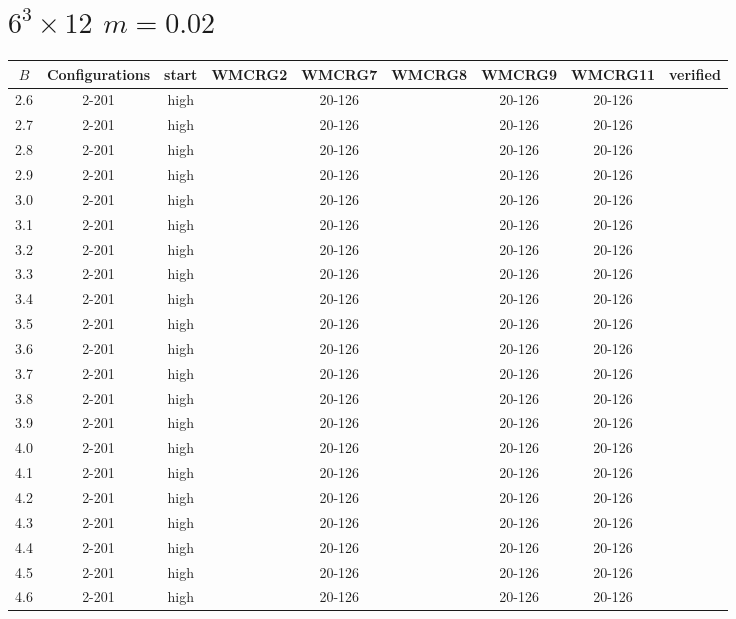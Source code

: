 \documentclass{article}
\begin{document}
  \section*{$6^3\times12$  $m=0.02$}
    \begin{center}
    \begin{tabular}{| c | c | c | c | c | c | c | c | c |}
      \hline
      $B$ & Configurations & start & WMCRG2 & WMCRG7 & WMCRG8 & WMCRG9 & WMCRG11 & verified\\
      \hline
      2.6 & 2-201 & high &  & 20-126 &  & 20-126 & 20-126 &\\
      2.7 & 2-201 & high &  & 20-126 &  & 20-126 & 20-126 &\\
      2.8 & 2-201 & high &  & 20-126 &  & 20-126 & 20-126 &\\
      2.9 & 2-201 & high &  & 20-126 &  & 20-126 & 20-126 &\\
      3.0 & 2-201 & high &  & 20-126 &  & 20-126 & 20-126 &\\
      3.1 & 2-201 & high &  & 20-126 &  & 20-126 & 20-126 &\\
      3.2 & 2-201 & high &  & 20-126 &  & 20-126 & 20-126 &\\
      3.3 & 2-201 & high &  & 20-126 &  & 20-126 & 20-126 &\\
      3.4 & 2-201 & high &  & 20-126 &  & 20-126 & 20-126 &\\
      3.5 & 2-201 & high &  & 20-126 &  & 20-126 & 20-126 &\\
      3.6 & 2-201 & high &  & 20-126 &  & 20-126 & 20-126 &\\
      3.7 & 2-201 & high &  & 20-126 &  & 20-126 & 20-126 &\\
      3.8 & 2-201 & high &  & 20-126 &  & 20-126 & 20-126 &\\
      3.9 & 2-201 & high &  & 20-126 &  & 20-126 & 20-126 &\\
      4.0 & 2-201 & high &  & 20-126 &  & 20-126 & 20-126 &\\
      4.1 & 2-201 & high &  & 20-126 &  & 20-126 & 20-126 &\\
      4.2 & 2-201 & high &  & 20-126 &  & 20-126 & 20-126 &\\
      4.3 & 2-201 & high &  & 20-126 &  & 20-126 & 20-126 &\\
      4.4 & 2-201 & high &  & 20-126 &  & 20-126 & 20-126 &\\
      4.5 & 2-201 & high &  & 20-126 &  & 20-126 & 20-126 &\\
      4.6 & 2-201 & high &  & 20-126 &  & 20-126 & 20-126 &\\

\end{tabular}
\end{center}
\end{document}
